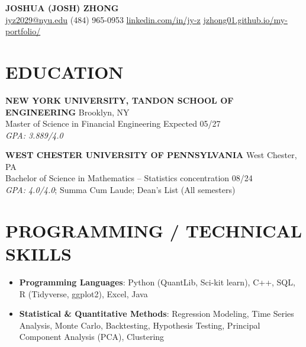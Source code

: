 \documentclass[10pt, letterpaper]{article}
\begin{document}
\begin{center}
  \textbf{{\Large JOSHUA (JOSH) ZHONG}} \\[5pt]
  {\large \href{mailto:jyz2029@nyu.edu}{jyz2029@nyu.edu} \hspace{2pt}\textbar\hspace{2pt} (484) 965-0953 \hspace{2pt}\textbar\hspace{2pt} \href{https://www.linkedin.com/in/jy-z/}{linkedin.com/in/jy-z} \hspace{2pt}\textbar\hspace{2pt}\href{https://jzhong01.github.io/my-portfolio/}{jzhong01.github.io/my-portfolio/}}
\end{center}

\vspace{-2pt}

\section{EDUCATION}

\textbf{NEW YORK UNIVERSITY, TANDON SCHOOL OF ENGINEERING} \hfill Brooklyn, NY \\
Master of Science in Financial Engineering \hfill Expected 05/27 \\
\textit{GPA: 3.889/4.0}

\vspace{3pt}

\textbf{WEST CHESTER UNIVERSITY OF PENNSYLVANIA} \hfill West Chester, PA \\
Bachelor of Science in Mathematics -- Statistics concentration \hfill 08/24 \\
\textit{GPA: 4.0/4.0}; Summa Cum Laude; Dean's List (All semesters)

\section{PROGRAMMING / TECHNICAL SKILLS}

\begin{itemize}
  \item \textbf{Programming Languages}: Python (QuantLib, Sci-kit learn), C++, SQL, R (Tidyverse, ggplot2), Excel, Java
  \item \textbf{Statistical \& Quantitative Methods}: Regression Modeling, Time Series Analysis, Monte Carlo, Backtesting, Hypothesis Testing, Principal Component Analysis (PCA), Clustering
\end{itemize}
\end{document}
